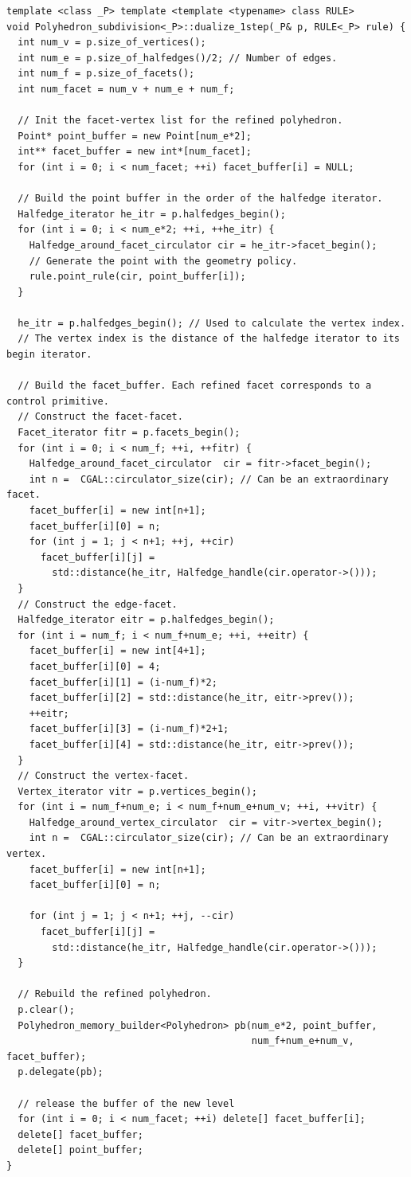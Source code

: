 \begin{lstlisting}
template <class _P> template <template <typename> class RULE>
void Polyhedron_subdivision<_P>::dualize_1step(_P& p, RULE<_P> rule) {
  int num_v = p.size_of_vertices();
  int num_e = p.size_of_halfedges()/2; // Number of edges.
  int num_f = p.size_of_facets();
  int num_facet = num_v + num_e + num_f;
  
  // Init the facet-vertex list for the refined polyhedron.
  Point* point_buffer = new Point[num_e*2];
  int** facet_buffer = new int*[num_facet];
  for (int i = 0; i < num_facet; ++i) facet_buffer[i] = NULL;

  // Build the point buffer in the order of the halfedge iterator.
  Halfedge_iterator he_itr = p.halfedges_begin(); 
  for (int i = 0; i < num_e*2; ++i, ++he_itr) {
    Halfedge_around_facet_circulator cir = he_itr->facet_begin();
    // Generate the point with the geometry policy.
    rule.point_rule(cir, point_buffer[i]);
  }

  he_itr = p.halfedges_begin(); // Used to calculate the vertex index.
  // The vertex index is the distance of the halfedge iterator to its begin iterator.
  
  // Build the facet_buffer. Each refined facet corresponds to a control primitive.
  // Construct the facet-facet.
  Facet_iterator fitr = p.facets_begin();  
  for (int i = 0; i < num_f; ++i, ++fitr) {
    Halfedge_around_facet_circulator  cir = fitr->facet_begin();
    int n =  CGAL::circulator_size(cir); // Can be an extraordinary facet.
    facet_buffer[i] = new int[n+1];
    facet_buffer[i][0] = n;
    for (int j = 1; j < n+1; ++j, ++cir)
      facet_buffer[i][j] = 
        std::distance(he_itr, Halfedge_handle(cir.operator->())); 
  }
  // Construct the edge-facet.
  Halfedge_iterator eitr = p.halfedges_begin();
  for (int i = num_f; i < num_f+num_e; ++i, ++eitr) {
    facet_buffer[i] = new int[4+1];
    facet_buffer[i][0] = 4;
    facet_buffer[i][1] = (i-num_f)*2;
    facet_buffer[i][2] = std::distance(he_itr, eitr->prev());    
    ++eitr;
    facet_buffer[i][3] = (i-num_f)*2+1; 
    facet_buffer[i][4] = std::distance(he_itr, eitr->prev());    
  }
  // Construct the vertex-facet.
  Vertex_iterator vitr = p.vertices_begin();
  for (int i = num_f+num_e; i < num_f+num_e+num_v; ++i, ++vitr) {
    Halfedge_around_vertex_circulator  cir = vitr->vertex_begin();
    int n =  CGAL::circulator_size(cir); // Can be an extraordinary vertex.
    facet_buffer[i] = new int[n+1];
    facet_buffer[i][0] = n;

    for (int j = 1; j < n+1; ++j, --cir)
      facet_buffer[i][j] = 
        std::distance(he_itr, Halfedge_handle(cir.operator->())); 
  }
  
  // Rebuild the refined polyhedron. 
  p.clear();
  Polyhedron_memory_builder<Polyhedron> pb(num_e*2, point_buffer, 
                                           num_f+num_e+num_v, facet_buffer);
  p.delegate(pb);
  
  // release the buffer of the new level
  for (int i = 0; i < num_facet; ++i) delete[] facet_buffer[i];
  delete[] facet_buffer;
  delete[] point_buffer;
}
\end{lstlisting}
